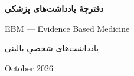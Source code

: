 \begin{titlepage}
  \thispagestyle{empty}
  \vspace*{\fill}
  \begin{center}
    {\Huge\bfseries دفترچهٔ یادداشت‌های پزشکی\par}
    \vspace{1.2em}
    {\LARGE\begin{latin}EBM --- Evidence Based Medicine\end{latin}\par}
    \vspace{2.5em}
    {\Large یادداشت‌های شخصیِ بالینی\par}
    \vspace{4em}
    {\large\begin{latin}October 2026\end{latin}\par}
  \end{center}
  \vspace*{\fill}
\end{titlepage}
